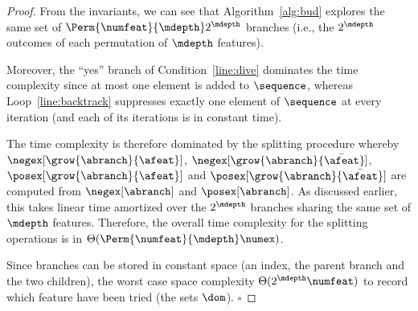 \documentclass{llncs}
\begin{document}
			
			\begin{proof}
				From the invariants, we can see that Algorithm~\ref{alg:bud} explores the same set of $\Perm{\numfeat}{\mdepth}2^\mdepth$ branches (i.e., the $2^{\mdepth}$ outcomes of each permutation of ${\mdepth}$ features).
				
				Moreover, the ``yes'' branch of Condition~\ref{line:dive} dominates the time complexity since at most one element is added to $\sequence$, whereas  Loop~\ref{line:backtrack} suppresses exactly one element of $\sequence$ at every iteration (and each of its iterations is in constant time).
				
				The time complexity is therefore dominated by the splitting procedure whereby $\negex[\grow{\abranch}{\afeat}]$, $\negex[\grow{\abranch}{\bar{\afeat}}]$, $\posex[\grow{\abranch}{\afeat}]$ and $\posex[\grow{\abranch}{\bar{\afeat}}]$ are computed from $\negex[\abranch]$ and $\posex[\abranch]$. As discussed earlier, this takes linear time amortized over the $2^{\mdepth}$ branches sharing the same set of $\mdepth$ features. Therefore, the overall time complexity for the splitting operations is in $\Theta(\Perm{\numfeat}{\mdepth}\numex)$.
				
				
				Since branches can be stored in constant space (an index, the parent branch and the two children),
				the worst case space complexity $\Theta(2^{\mdepth}\numfeat)$ to record which feature have been tried (the sets $\dom$).
					\hfill$\square$
				\end{proof}
				
\end{document}
